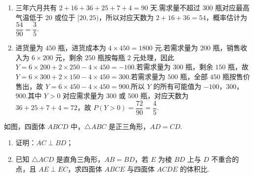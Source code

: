 \begin{solution}
\begin{enumerate}
\item 三年六月共有 \(2+16+36+25+7+4=90\) 天.需求量不超过 \(300\) 瓶对应最高气温低于 \(20\) 或位于 \([20,25)\)，所以对应天数为 \(2+16+36=54\)，概率估计为 \(\dfrac{54}{90}=\dfrac35\).
\item 进货量为 \(450\) 瓶，进货成本为 \(4\times450=1800\) 元.若需求量为 \(200\) 瓶，销售收入为 \(6\times200\) 元，剩余 \(250\) 瓶按每瓶 \(2\) 元处理，因此
\(Y=6\times200+2\times250-4\times450=-100\).若需求量为 \(300\) 瓶，剩余 \(150\) 瓶，故
\(Y=6\times300+2\times150-4\times450=300\).若需求量为 \(500\) 瓶，全部 \(450\) 瓶按售价售出，故 \(Y=6\times450-4\times450=900\).所以 \(Y\) 的所有可能值为 \(-100\)，\(300\)，\(900\).其中 \(Y>0\) 对应需求量为 \(300\) 或 \(500\) 瓶，对应天数为 \(36+25+7+4=72\)，故
\(P(Y>0)=\dfrac{72}{90}=\dfrac45\).
\end{enumerate}
\end{solution}

\begin{problem}
如图，四面体 \(ABCD\) 中，\(\triangle ABC\) 是正三角形，\(AD=CD\).

\begin{enumerate}
\item 证明：\(AC\perp BD\)；
\item 已知 \(\triangle ACD\) 是直角三角形，\(AB=BD\)，若 \(E\) 为棱 \(BD\) 上与 \(D\) 不重合的点，且 \(AE\perp EC\)，求四面体 \(ABCE\) 与四面体 \(ACDE\) 的体积比.
\end{enumerate}

\end{problem}

